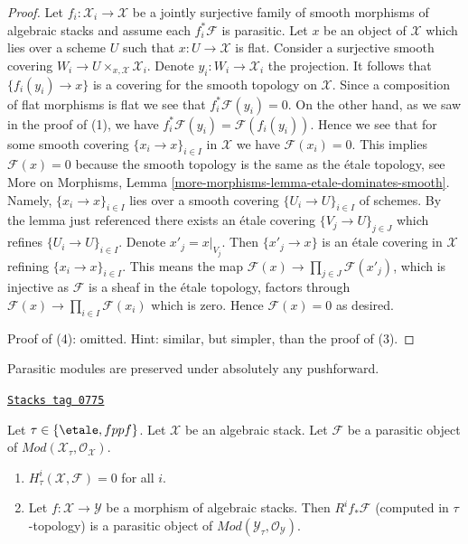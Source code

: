 \begin{proof}
\medskip\noindent
Let $f_i : \mathcal{X}_i \to \mathcal{X}$ be a jointly surjective family of
smooth morphisms of algebraic stacks and assume each $f_i^*\mathcal{F}$
is parasitic. Let $x$ be an object of $\mathcal{X}$ which lies over a
scheme $U$ such that $x : U \to \mathcal{X}$ is flat. Consider a surjective
smooth covering $W_i \to U \times_{x, \mathcal{X}} \mathcal{X}_i$.
Denote $y_i : W_i \to \mathcal{X}_i$ the projection. It follows
that $\{f_i(y_i) \to x\}$ is a covering for the smooth topology
on $\mathcal{X}$. Since a composition of flat morphisms is flat we see that
$f_i^*\mathcal{F}(y_i) = 0$. On the other hand, as we saw in the proof
of (1), we have $f_i^*\mathcal{F}(y_i) = \mathcal{F}(f_i(y_i))$.
Hence we see that for some smooth covering $\{x_i \to x\}_{i \in I}$
in $\mathcal{X}$ we have $\mathcal{F}(x_i) = 0$. This implies
$\mathcal{F}(x) = 0$ because the smooth topology is the same
as the \'etale topology, see
More on Morphisms, Lemma \ref{more-morphisms-lemma-etale-dominates-smooth}.
Namely, $\{x_i \to x\}_{i \in I}$ lies over a smooth covering
$\{U_i \to U\}_{i \in I}$ of schemes. By the lemma just referenced
there exists an \'etale covering $\{V_j \to U\}_{j \in J}$ which
refines $\{U_i \to U\}_{i \in I}$. Denote $x'_j = x|_{V_j}$.
Then $\{x'_j \to x\}$ is an \'etale covering in $\mathcal{X}$
refining $\{x_i \to x\}_{i \in I}$. This means the map
$\mathcal{F}(x) \to \prod_{j \in J} \mathcal{F}(x'_j)$, which is
injective as $\mathcal{F}$ is a sheaf in the \'etale topology,
factors through $\mathcal{F}(x) \to \prod_{i \in I} \mathcal{F}(x_i)$
which is zero. Hence $\mathcal{F}(x) = 0$ as desired.

\medskip\noindent
Proof of (4): omitted. Hint: similar, but simpler, than the proof of (3).
\end{proof}

Parasitic modules are preserved under absolutely any pushforward.

\begin{lemma}
\label{stacks-cohomology-lemma-pushforward-parasitic}
\href{https://stacks.math.columbia.edu/tag/0775}{\texttt{Stacks tag 0775}}

Let $\tau \in \{\etale, fppf\}$.
Let $\mathcal{X}$ be an algebraic stack.
Let $\mathcal{F}$ be a parasitic object of
$\textit{Mod}(\mathcal{X}_\tau, \mathcal{O}_\mathcal{X})$.
\begin{enumerate}
\item $H^i_\tau(\mathcal{X}, \mathcal{F}) = 0$ for all $i$.
\item Let $f : \mathcal{X} \to \mathcal{Y}$ be a morphism of algebraic stacks.
Then $R^if_*\mathcal{F}$ (computed in $\tau$-topology) is a
parasitic object of $\textit{Mod}(\mathcal{Y}_\tau, \mathcal{O}_\mathcal{Y})$.
\end{enumerate}
\end{lemma}


